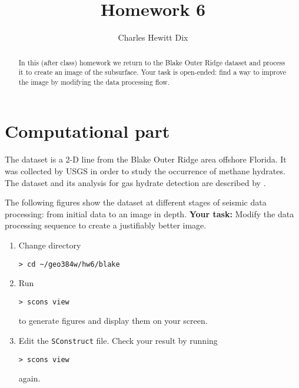 \author{Charles Hewitt Dix} 
\title{Homework 6}

\begin{abstract}
  In this (after class) homework we return to the Blake Outer Ridge
  dataset and process it to create an image of the subsurface. Your
  task is open-ended: find a way to improve the image by modifying the
  data processing flow.
\end{abstract}

\lstset{language=python,numbers=left,numberstyle=\tiny,showstringspaces=false}

\section{Computational part}

The dataset is a 2-D line from the Blake Outer Ridge area
offshore Florida. It was collected by USGS in order to study the
occurrence of methane hydrates. The dataset and its analysis for gas
hydrate detection are described by
\cite{GEO63-05-16591669,GEO65-02-05650573}.

The following figures show the dataset at different stages of seismic
data processing: from initial data to an image in depth. \textbf{Your
  task:} Modify the data processing sequence to create a justifiably
better image.





{\small
  }

\begin{enumerate}
\item Change directory 
\begin{verbatim}
> cd ~/geo384w/hw6/blake
\end{verbatim}
\item Run
\begin{verbatim}
> scons view
\end{verbatim}
to generate figures and display them on your screen.  
\item Edit the \texttt{SConstruct} file.
Check your result by running
\begin{verbatim}
> scons view
\end{verbatim}
again.
\end{enumerate}

